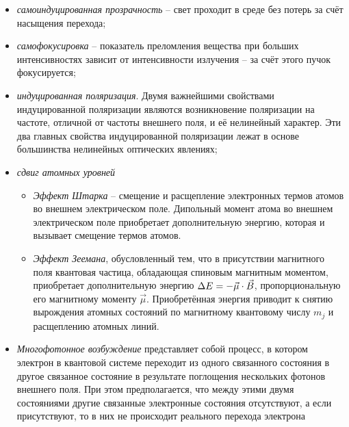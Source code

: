 
\begin{itemize}
    \itemsep -4pt
    \item \emph{самоиндуцированная прозрачность} --
        свет проходит в среде без потерь за счёт насыщения перехода;
    \item \emph{самофокусировка} --
        показатель преломления вещества при больших интенсивностях зависит
        от интенсивности излучения -- за счёт этого пучок фокусируется;
    \item \emph{индуцированная поляризация}.
        Двумя важнейшими свойствами индуцированной поляризации являются
        возникновение поляризации на частоте, отличной от частоты внешнего
        поля, и её нелинейный характер. Эти два главных свойства
        индуцированной поляризации лежат в основе большинства нелинейных
        оптических явлениях;
    \item \emph{сдвиг атомных уровней}
        \begin{itemize}
            \itemsep -2pt
            \item \emph{Эффект Штарка} -- смещение и расщепление электронных
                термов атомов во внешнем электрическом поле. Дипольный
                момент атома во внешнем электрическом поле приобретает
                дополнительную энергию, которая и вызывает смещение
                термов атомов.
            \item \emph{Эффект Зеемана}, обусловленный тем, что в присутствии
                магнитного поля квантовая частица, обладающая спиновым магнитным
                моментом, приобретает дополнительную энергию
                \( \Delta E = -\vec{\mu}\cdot\vec{B} \), пропорциональную его
                магнитному моменту \( \vec{\mu} \). Приобретённая энергия
                приводит к снятию вырождения атомных состояний по магнитному
                квантовому числу \( m_j \) и расщеплению атомных линий.
        \end{itemize}
    \item \emph{Многофотонное возбуждение} представляет собой процесс, в котором
        электрон в квантовой системе переходит из одного связанного состояния
        в другое связанное состояние в результате поглощения нескольких
        фотонов внешнего поля. При этом предполагается, что между этими двумя
        состояниями другие связанные электронные состояния отсутствуют, а
        если присутствуют, то в них не происходит реального перехода электрона

\end{itemize}
